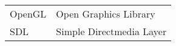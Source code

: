 \begin{longtable}{ll}
OpenGL & Open Graphics Library \\
SDL & Simple Directmedia Layer\\
\end{longtable}

